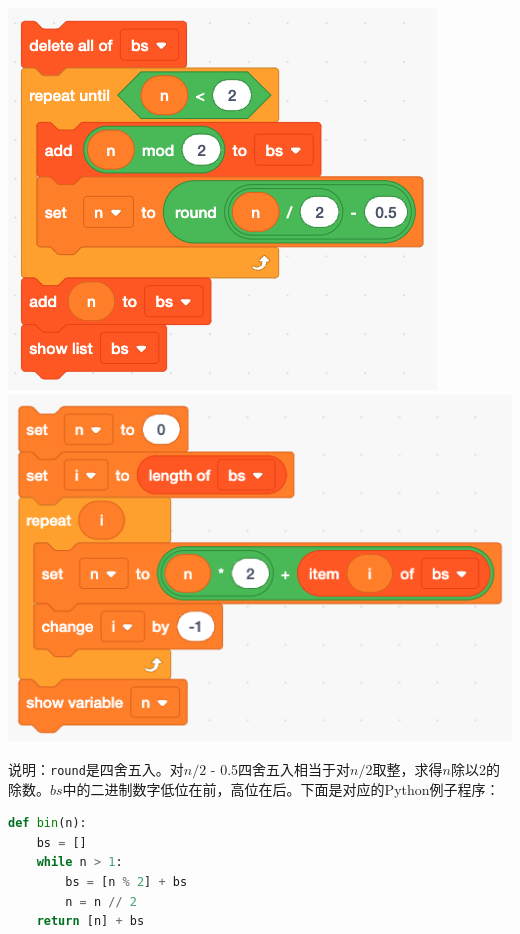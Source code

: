 \documentclass[b5paper]{ctexart}
\begin{document}
\begin{Answer}[ref={ex:numerals}]
{\begin{center}
 \includegraphics[scale=0.3]{img/scratch-bin}
 \qquad
 \includegraphics[scale=0.3]{img/scratch-dec}
 \label{fig:bin-dec-scratch}
\end{center}

说明：\lstinline|round|是四舍五入。对$n/2$ - 0.5四舍五入相当于对$n/2$取整，求得$n$除以2的除数。$bs$中的二进制数字低位在前，高位在后。下面是对应的Python例子程序：

\begin{lstlisting}[language=Python, frame=single]
def bin(n):
    bs = []
    while n > 1:
        bs = [n % 2] + bs
        n = n // 2
    return [n] + bs


\end{lstlisting}}
\end{Answer}
\end{document}
